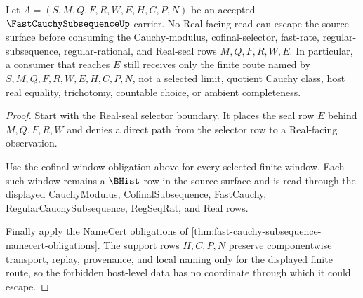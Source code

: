 \begin{theorem}
\label{thm:fast-cauchy-subsequence-real-seal-nonescape}
Let $A=(S,M,Q,F,R,W,E,H,C,P,N)$ be an accepted $\FastCauchySubsequenceUp$ carrier. No Real-facing read can escape the source surface before consuming the Cauchy-modulus, cofinal-selector, fast-rate, regular-subsequence, regular-rational, and Real-seal rows $M,Q,F,R,W,E$. In particular, a consumer that reaches $E$ still receives only the finite route named by $S,M,Q,F,R,W,E,H,C,P,N$, not a selected limit, quotient Cauchy class, host real equality, trichotomy, countable choice, or ambient completeness.
\end{theorem}
\begin{proof}
Start with the Real-seal selector boundary. It places the seal row $E$ behind $M,Q,F,R,W$ and denies a direct path from the selector row to a Real-facing observation.

Use the cofinal-window obligation above for every selected finite window. Each such window remains a $\BHist$ row in the source surface and is read through the displayed CauchyModulus, CofinalSubsequence, FastCauchy, RegularCauchySubsequence, RegSeqRat, and Real rows.

Finally apply the NameCert obligations of \autoref{thm:fast-cauchy-subsequence-namecert-obligations}. The support rows $H,C,P,N$ preserve componentwise transport, replay, provenance, and local naming only for the displayed finite route, so the forbidden host-level data has no coordinate through which it could escape.
\end{proof}

